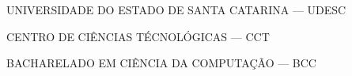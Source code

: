 
\renewcommand{\imprimircapa}{%
	\begin{capa}%
		\center%

		{\fontseries{b}\selectfont\MakeTextUppercase{UNIVERSIDADE DO ESTADO DE SANTA CATARINA --- UDESC}}

		{\fontseries{b}\selectfont\MakeTextUppercase{CENTRO DE CIÊNCIAS TÉCNOLÓGICAS --- CCT  }}

		{\fontseries{b}\selectfont\MakeTextUppercase{BACHARELADO EM CIÊNCIA DA COMPUTAÇÃO --- BCC  }}

		\vfill

		{\fontseries{b}\selectfont\MakeTextUppercase{\normalsize\imprimirautor}}

		\vfill
		\begin{center}
			{\fontseries{b}\selectfont\MakeTextUppercase{\imprimirtitulo}}
		\end{center}
		\vfill

		\vfill

		{\fontseries{b}\selectfont\MakeTextUppercase{\imprimirlocal}}
		\par
		{\selectfont \imprimirdata}
		\vspace*{1cm}
	\end{capa}
}

\imprimircapa%